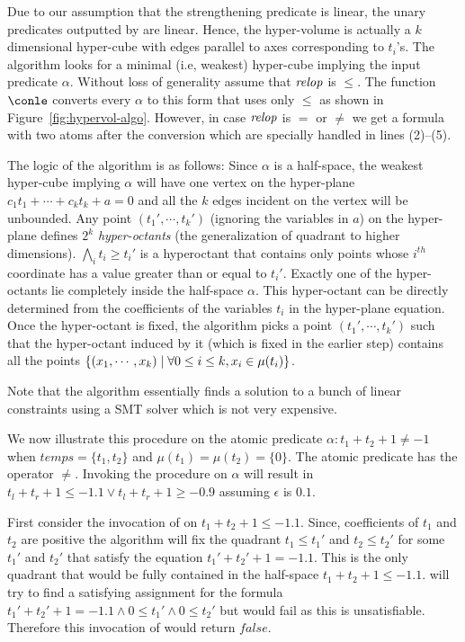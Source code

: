 Due to our assumption that the strengthening predicate is linear, the unary predicates 
outputted by \hypervol are linear. Hence, the hyper-volume is actually a $k$ dimensional 
hyper-cube with edges parallel to axes corresponding to $t_i$'s.
The algorithm looks for a minimal (i.e, weakest) hyper-cube implying the input predicate $\alpha$.
Without loss of generality assume that $\mathit{relop}$ is $\le$.
The function $\conle$ converts every $\alpha$ to this form that uses only $\le$ 
as shown in Figure~\ref{fig:hypervol-algo}.
However, in case $\mathit{relop}$ is $=$ or $\ne$ we get a formula with two atoms after the conversion 
which are specially handled in lines (2)--(5).

The logic of the algorithm is as follows: 
Since $\alpha$ is a half-space, the weakest hyper-cube implying $\alpha$ will have one vertex on 
the hyper-plane $c_1t_1 + \cdots + c_kt_k + a = 0$ and all the $k$ edges incident on the 
vertex will be unbounded.
Any point $(t_1',\cdots,t_k')$ (ignoring the variables in $a$) on the hyper-plane
defines $2^{k}$ \emph{hyper-octants} (the generalization of quadrant to higher dimensions).
\eg{} $\bigwedge_i t_i \ge t_i'$ is a hyperoctant that contains only points whose $i^{th}$ coordinate 
has a value greater than or equal to $t_i'$.
Exactly one of the hyper-octants lie completely inside the half-space $\alpha$.
This hyper-octant can be directly determined from the coefficients of the variables $t_i$ in the 
hyper-plane equation.
Once the hyper-octant is fixed, the algorithm picks a point $(t_1',\cdots,t_k')$ such that
the hyper-octant induced by it (which is fixed in the earlier step) contains all the points 
$\{ (x_1,\cdots,x_k) \; | \; \forall 0 \le i \le k, x_i \in \mu(t_i) \}$.

Note that the algorithm essentially finds a solution to a bunch of linear constraints using
a SMT solver which is not very expensive.

We now illustrate this procedure on the atomic predicate $\alpha: t_1 + t_2 + 1 \ne -1$ when
$temps = \{ t_1,t_2 \}$ and $\mu(t_1) = \mu(t_2) = \{ 0 \}$. 
The atomic predicate has the operator $\ne$.
Invoking the procedure \conle on $\alpha$ will result in 
$t_l + t_r + 1 \le -1.1 \vee t_l + t_r + 1 \ge -0.9$ assuming $\epsilon$ is $0.1$. 

First consider the invocation of \hypervol on $t_1 + t_2 + 1 \le -1.1$. Since, coefficients 
of $t_1$ and $t_2$ are positive the algorithm will fix the quadrant $t_1 \le t_1'$ and $t_2 \le t_2'$
for some $t_1'$ and $t_2'$ that satisfy the equation $t_1' + t_2' + 1 = -1.1$. 
This is the only quadrant that would be fully contained in the half-space $t_1 + t_2 + 1 \le -1.1$.
\hypervol will try to find a satisfying assignment for the formula 
$t_1' + t_2' + 1 = -1.1 \wedge 0 \le t_1' \wedge 0 \le t_2'$ but would fail as this is unsatisfiable.
Therefore this invocation of \hypervol would return $false$.

